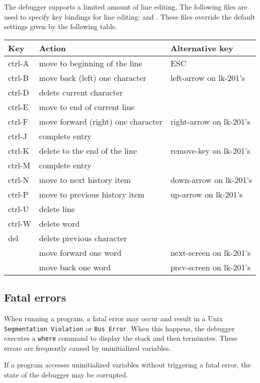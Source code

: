 The debugger supports a limited amount of line editing.  The following
files are used to specify key bindings for line editing:
 and .  These files
override the default settings given by the following table.
\begin{center}
\begin{tabular}{|l|l|l|}\hline
Key	   & Action	&Alternative key\\
\hline
ctrl-A & move to beginning of the line  	&ESC\\
ctrl-B & move back (left) one character 	&left-arrow on lk-201's\\
ctrl-D & delete current character		&\\
ctrl-E & move to end of current line		&\\
ctrl-F & move forward (right) one character     &right-arrow on lk-201's\\
ctrl-J & complete entry				&\\
ctrl-K & delete to the end of the line 		&remove-key on lk-201's\\
ctrl-M & complete entry				&\\
ctrl-N & move to next history item     		&down-arrow on lk-201's\\
ctrl-P & move to previous history item 		&up-arrow on lk-201's\\
ctrl-U & delete line				&\\
ctrl-W & delete word				&\\
del    & delete previous character              &\\
       & move forward one word			& next-screen on lk-201's\\
       & move back one word			& prev-screen on lk-201's\\
\hline
\end{tabular}
\end{center}

\subsection{Fatal errors}

When running a program, a fatal error may occur and result in a Unix
{\tt Segmentation Violation} or {\tt Bus Error}.  When this happens,
the debugger executes a {\tt where} command to display the stack and
then terminates.  These errors are frequently caused by uninitialized
variables.

If a program accesses uninitialized variables without triggering a
fatal error, the state of the debugger may be corrupted.

